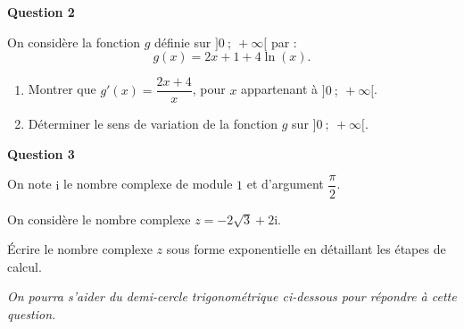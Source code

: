 \textbf{Question 2}

\medskip

On considère la fonction $g$ définie sur $]0~;~+\infty[$ par :
\[g(x) = 2x + 1 + 4\ln(x).\]

\begin{enumerate}
    \item Montrer que $g'(x) = \dfrac{2x + 4}{x}$, pour $x$ appartenant à $]0~;~+\infty[$.
    \item Déterminer le sens de variation de la fonction $g$ sur $]0~;~+\infty[$.
\end{enumerate}

\bigskip

\textbf{Question 3}

\medskip

On note $\text{i}$ le nombre complexe de module $1$ et d'argument $\dfrac{\pi}{2}$.

On considère le nombre complexe $z = -2\sqrt3 + 2\text{i}$.

\medskip

Écrire le nombre complexe $z$ sous forme exponentielle en détaillant les étapes de calcul.

\textit{On pourra s'aider du demi-cercle trigonométrique ci-dessous pour répondre à cette question.}

